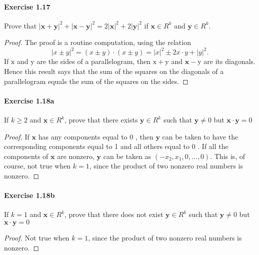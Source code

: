 \documentclass{article}
\theoremstyle{definition}
\begin{document}
\paragraph{Exercise 1.17} Prove that $|\mathbf{x}+\mathbf{y}|^{2}+|\mathbf{x}-\mathbf{y}|^{2}=2|\mathbf{x}|^{2}+2|\mathbf{y}|^{2}$ if $\mathbf{x} \in R^{k}$ and $\mathbf{y} \in R^{k}$.
\begin{proof}
    The proof is a routine computation, using the relation
$$
|x \pm y|^2=(x \pm y) \cdot(x \pm y)=|x|^2 \pm 2 x \cdot y+|y|^2 .
$$
If $\mathrm{x}$ and $\mathrm{y}$ are the sides of a parallelogram, then $\mathrm{x}+\mathrm{y}$ and $\mathbf{x}-\mathrm{y}$ are its diagonals. Hence this result says that the sum of the squares on the diagonals of a parallelogram equals the sum of the squares on the sides.
\end{proof}



\paragraph{Exercise 1.18a} If $k \geq 2$ and $\mathbf{x} \in R^{k}$, prove that there exists $\mathbf{y} \in R^{k}$ such that $\mathbf{y} \neq 0$ but $\mathbf{x} \cdot \mathbf{y}=0$
\begin{proof}
    If $\mathbf{x}$ has any components equal to 0 , then $\mathbf{y}$ can be taken to have the corresponding components equal to 1 and all others equal to 0 . If all the components of $\mathbf{x}$ are nonzero, $\mathbf{y}$ can be taken as $\left(-x_2, x_1, 0, \ldots, 0\right)$. This is, of course, not true when $k=1$, since the product of two nonzero real numbers is nonzero.
\end{proof}



\paragraph{Exercise 1.18b} If $k = 1$ and $\mathbf{x} \in R^{k}$, prove that there does not exist $\mathbf{y} \in R^{k}$ such that $\mathbf{y} \neq 0$ but $\mathbf{x} \cdot \mathbf{y}=0$
\begin{proof}
    Not true when $k=1$, since the product of two nonzero real numbers is nonzero.
\end{proof}
\end{document}
